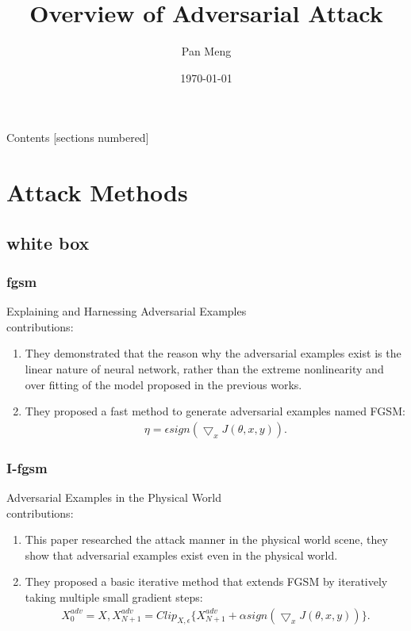 \documentclass[10pt]{beamer}
\title{Overview of Adversarial Attack}
\date{\today}
\author{Pan Meng}
\institute{School of Computer Science, Sun Yat-sen University}
\begin{document}
\maketitle
\begin{frame}[allowframebreaks]{Contents}
  [sections numbered]
  \tableofcontents
\end{frame}

\section{Attack Methods}
\subsection{white box}

\subsubsection{fgsm}
\begin{frame}
  Explaining and Harnessing Adversarial Examples~\cite{fgsm}\\
  contributions:
  \begin{enumerate}
    \item They demonstrated that the reason why the adversarial examples exist is the linear nature of neural network, rather than the extreme nonlinearity and over fitting of the model proposed in the previous works.
    \item They proposed a fast method to generate adversarial examples named FGSM:
      \begin{align}
        \eta = \epsilon sign(\bigtriangledown_{x}J(\theta, x, y)) .
      \end{align}
  \end{enumerate}
\end{frame}

\subsubsection{I-fgsm}
\begin{frame}
  Adversarial Examples in the Physical World~\cite{ifgsm}\\
  contributions:
  \begin{enumerate}
    \item This paper researched the attack manner in the physical world scene, they  show that adversarial examples exist even in the physical world.
    \item They proposed a basic iterative method that extends FGSM by iteratively taking multiple small gradient steps:
    \begin{align}
      X_0^{adv} = X, X_{N+1}^{adv} = Clip_{X,\epsilon} \{X_{N+1}^{adv} + \alpha sign(\bigtriangledown_{x}J(\theta, x, y))\} . 
    \end{align}
  \end{enumerate}
\end{frame}
\end{document}
